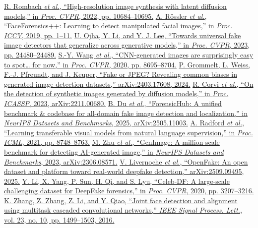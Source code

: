  \href{https://arxiv.org/abs/2112.10752}{R. Rombach \emph{et al.}, ``High-resolution image synthesis with latent diffusion models,'' in \emph{Proc. CVPR}, 2022, pp. 10684--10695.}
 \href{https://arxiv.org/abs/1901.08971}{A. R\"ossler \emph{et al.}, ``FaceForensics++: Learning to detect manipulated facial images,'' in \emph{Proc. ICCV}, 2019, pp. 1--11.}
 \href{https://arxiv.org/abs/2302.10174}{U. Ojha, Y. Li, and Y. J. Lee, ``Towards universal fake image detectors that generalize across generative models,'' in \emph{Proc. CVPR}, 2023, pp. 24480--24489.}
 \href{https://arxiv.org/abs/1912.11035}{S.-Y. Wang \emph{et al.}, ``CNN-generated images are surprisingly easy to spot\ldots{} for now,'' in \emph{Proc. CVPR}, 2020, pp. 8695--8704.}
 \href{https://arxiv.org/abs/2403.17608}{P. Grommelt, L. Weiss, F.-J. Pfreundt, and J. Keuper, ``Fake or JPEG? Revealing common biases in generated image detection datasets,'' arXiv:2403.17608, 2024.}
 \href{https://arxiv.org/abs/2211.00680}{R. Corvi \emph{et al.}, ``On the detection of synthetic images generated by diffusion models,'' in \emph{Proc. ICASSP}, 2023, arXiv:2211.00680.}
 \href{https://arxiv.org/abs/2505.11003}{B. Du \emph{et al.}, ``ForensicHub: A unified benchmark \& codebase for all-domain fake image detection and localization,'' in \emph{NeurIPS Datasets and Benchmarks}, 2025, arXiv:2505.11003.}
 \href{https://arxiv.org/abs/2103.00020}{A. Radford \emph{et al.}, ``Learning transferable visual models from natural language supervision,'' in \emph{Proc. ICML}, 2021, pp. 8748--8763.}
 \href{https://arxiv.org/abs/2306.08571}{M. Zhu \emph{et al.}, ``GenImage: A million-scale benchmark for detecting AI-generated image,'' in \emph{NeurIPS Datasets and Benchmarks}, 2023, arXiv:2306.08571.}
 \href{https://arxiv.org/abs/2509.09495}{V. Livernoche \emph{et al.}, ``OpenFake: An open dataset and platform toward real-world deepfake detection,'' arXiv:2509.09495, 2025.}
 \href{https://arxiv.org/abs/1909.12962}{Y. Li, X. Yang, P. Sun, H. Qi, and S. Lyu, ``Celeb-DF: A large-scale challenging dataset for DeepFake forensics,'' in \emph{Proc. CVPR}, 2020, pp. 3207--3216.}
 \href{https://arxiv.org/abs/1604.02878}{K. Zhang, Z. Zhang, Z. Li, and Y. Qiao, ``Joint face detection and alignment using multitask cascaded convolutional networks,'' \emph{IEEE Signal Process. Lett.}, vol. 23, no. 10, pp. 1499--1503, 2016.}
